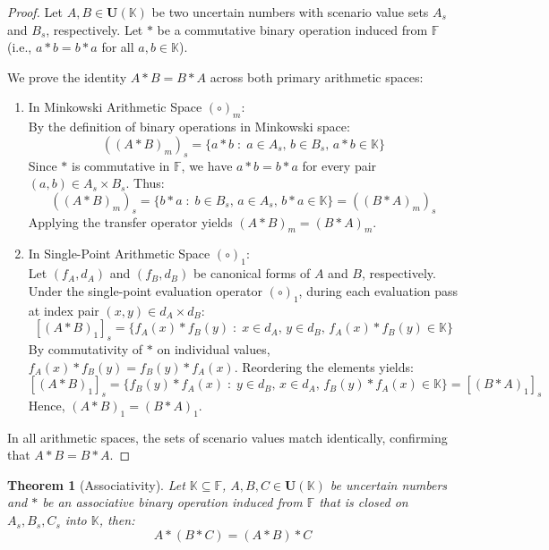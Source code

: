\documentclass[a4paper,12pt,twoside]{memoir}
\newtheorem{theorem}{Theorem}[chapter]
\newcommand{\tsbd}[1]{\mathbf{U}(\mathbb{#1})}
\newcommand{\kgdd}[1]{\left(#1\right)_1} %
\begin{document}
	\begin{proof}
		Let $A, B \in \tsbd{K}$ be two uncertain numbers with scenario value sets $A_s$ and $B_s$, respectively. Let $*$ be a commutative binary operation induced from $\mathbb{F}$ (i.e., $a * b = b * a$ for all $a, b \in \mathbb{K}$).
		
		We prove the identity $A * B = B * A$ across both primary arithmetic spaces:
		
		\begin{enumerate}[leftmargin=*]
			\item In Minkowski Arithmetic Space $(\circ)_m$: \\
			By the definition of binary operations in Minkowski space:
			\[
			((A * B)_m)_s = \{a * b \;:\; a \in A_s, \, b \in B_s, \, a * b \in \mathbb{K}\}
			\]
			Since $*$ is commutative in $\mathbb{F}$, we have $a * b = b * a$ for every pair $(a, b) \in A_s \times B_s$. Thus:
			\[
			((A * B)_m)_s = \{b * a \;:\; b \in B_s, \, a \in A_s, \, b * a \in \mathbb{K}\} = ((B * A)_m)_s
			\]
			Applying the transfer operator yields $(A * B)_m = (B * A)_m$.
			
			\item In Single-Point Arithmetic Space $(\circ)_1$: \\
			Let $(f_A, d_A)$ and $(f_B, d_B)$ be canonical forms of $A$ and $B$, respectively. Under the single-point evaluation operator $\kgdd{\circ}$, during each evaluation pass at index pair $(x, y) \in d_A \times d_B$:
			\[
			[\kgdd{A * B}]_s = \{f_A(x) * f_B(y) \;:\; x \in d_A, \, y \in d_B, \, f_A(x) * f_B(y) \in \mathbb{K}\}
			\]
			By commutativity of $*$ on individual values, $f_A(x) * f_B(y) = f_B(y) * f_A(x)$. Reordering the elements yields:
			\[
			[\kgdd{A * B}]_s = \{f_B(y) * f_A(x) \;:\; y \in d_B, \, x \in d_A, \, f_B(y) * f_A(x) \in \mathbb{K}\} = [\kgdd{B * A}]_s
			\]
			Hence, $\kgdd{A * B} = \kgdd{B * A}$.
		\end{enumerate}
		
		In all arithmetic spaces, the sets of scenario values match identically, confirming that $A * B = B * A$.
	\end{proof}
	\begin{theorem}[Associativity]
		Let $\mathbb{K} \subseteq \mathbb{F}$, $A,B,C \in \tsbd{K}$ be uncertain numbers and $*$ be an associative binary operation induced from $\mathbb{F}$ that is closed on $A_s, B_s, C_s$ into $\mathbb{K}$, then:
		\[A*(B*C) = (A*B)*C\]
	\end{theorem}
\end{document}
